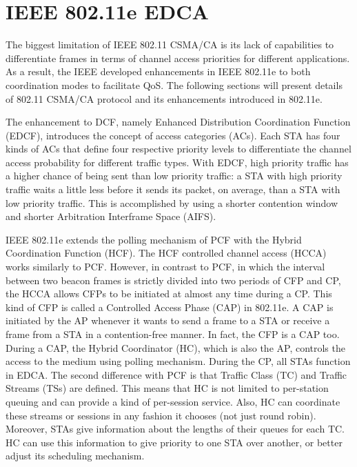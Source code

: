 \section{IEEE 802.11e EDCA}
\label{80211e}

The biggest limitation of IEEE 802.11 CSMA/CA is its lack of capabilities to differentiate frames in terms of channel access priorities for different applications. As a result, the IEEE developed enhancements in IEEE 802.11e to both coordination modes to facilitate QoS. The following sections will present details of 802.11 CSMA/CA protocol and its enhancements introduced in 802.11e. 

The enhancement to DCF, namely Enhanced Distribution Coordination Function (EDCF), introduces the concept of access categories (ACs). Each STA has four kinds of ACs that define four respective priority levels to differentiate the channel access probability for different traffic types. With EDCF, high priority traffic has a higher chance of being sent than low priority traffic: a STA with high priority traffic waits a little less before it sends its packet, on average, than a STA with low priority traffic. This is accomplished by using a shorter contention window and shorter Arbitration Interframe Space (AIFS).

IEEE 802.11e extends the polling mechanism of PCF with the Hybrid Coordination Function (HCF). The HCF controlled channel access (HCCA) works similarly to PCF. However, in contrast to PCF, in which the interval between two beacon frames is strictly divided into two periods of CFP and CP, the HCCA allows CFPs to be initiated at almost any time during a CP. This kind of CFP is called a Controlled Access Phase (CAP) in 802.11e. A CAP is initiated by the AP whenever it wants to send a frame to a STA or receive a frame from a STA in a contention-free manner. In fact, the CFP is a CAP too. During a CAP, the Hybrid Coordinator (HC), which is also the AP, controls the access to the medium using polling mechanism. During the CP, all STAs function in EDCA. The second difference with PCF is that Traffic Class (TC) and Traffic Streams (TSs) are defined. This means that HC is not limited to per-station queuing and can provide a kind of per-session service. Also, HC can coordinate these streams or sessions in any fashion it chooses (not just round robin). Moreover, STAs give information about the lengths of their queues for each TC. HC can use this information to give priority to one STA over another, or better adjust its scheduling mechanism.

